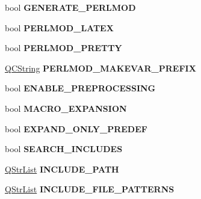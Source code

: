 \begin{DoxyCompactItemize}
\item 
\mbox{\label{class_config_values_a4dd769ad10b896f416876d20ece69d16}} 
bool {\bfseries G\+E\+N\+E\+R\+A\+T\+E\+\_\+\+P\+E\+R\+L\+M\+OD}
\item 
\mbox{\label{class_config_values_af9a68c73b8c594185e4a3232943bc242}} 
bool {\bfseries P\+E\+R\+L\+M\+O\+D\+\_\+\+L\+A\+T\+EX}
\item 
\mbox{\label{class_config_values_a503f3f1f3e3c35fd93e0d1e174f8dfd7}} 
bool {\bfseries P\+E\+R\+L\+M\+O\+D\+\_\+\+P\+R\+E\+T\+TY}
\item 
\mbox{\label{class_config_values_a0dd32844c7ca949888bf314b5e80bd44}} 
\mbox{\hyperlink{class_q_c_string}{Q\+C\+String}} {\bfseries P\+E\+R\+L\+M\+O\+D\+\_\+\+M\+A\+K\+E\+V\+A\+R\+\_\+\+P\+R\+E\+F\+IX}
\item 
\mbox{\label{class_config_values_ac99a249b9971aa67ea58b04de1170d60}} 
bool {\bfseries E\+N\+A\+B\+L\+E\+\_\+\+P\+R\+E\+P\+R\+O\+C\+E\+S\+S\+I\+NG}
\item 
\mbox{\label{class_config_values_ae6b9b9c115b6f9202eea5ed7472d6962}} 
bool {\bfseries M\+A\+C\+R\+O\+\_\+\+E\+X\+P\+A\+N\+S\+I\+ON}
\item 
\mbox{\label{class_config_values_aee23555105ac5d2690c48327ad294e72}} 
bool {\bfseries E\+X\+P\+A\+N\+D\+\_\+\+O\+N\+L\+Y\+\_\+\+P\+R\+E\+D\+EF}
\item 
\mbox{\label{class_config_values_a886f77ced1e864d4ddb2e9c37fb1508f}} 
bool {\bfseries S\+E\+A\+R\+C\+H\+\_\+\+I\+N\+C\+L\+U\+D\+ES}
\item 
\mbox{\label{class_config_values_a35e7555b84b14239d03c06ed180039e6}} 
\mbox{\hyperlink{class_q_str_list}{Q\+Str\+List}} {\bfseries I\+N\+C\+L\+U\+D\+E\+\_\+\+P\+A\+TH}
\item 
\mbox{\label{class_config_values_ae74aa1612cadd10c3d5241a2a3df651b}} 
\mbox{\hyperlink{class_q_str_list}{Q\+Str\+List}} {\bfseries I\+N\+C\+L\+U\+D\+E\+\_\+\+F\+I\+L\+E\+\_\+\+P\+A\+T\+T\+E\+R\+NS}

\end{DoxyCompactItemize}

